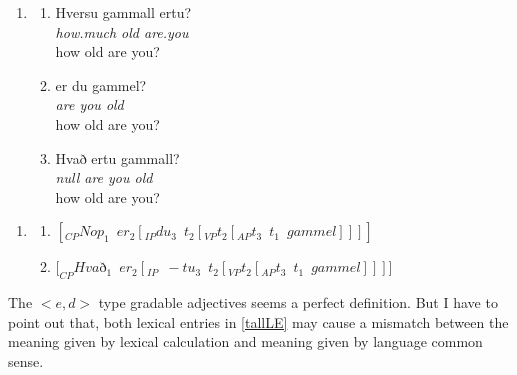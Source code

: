 \documentclass{ctexart}
\begin{document}
\begin{enumerate}
    \item \label{Icelandic_example}
    
    \begin{enumerate}
        \item \label{Icelandic_example_10}
        Hversu gammall ertu? \\
        \textit{how.much old are.you} \\
        how old are you?

        \item \label{Icelandic_example_a}
        er du gammel? \\
        \textit{are you old} \\
        how old are you?

        \item \label{Icelandic_example_b}
        Hvað ertu gammall? \\
        \textit{null are you old} \\
        how old are you?

    \end{enumerate}   
    
\end{enumerate}

\begin{enumerate}
    \item \label{Icelandic_example_LE}
    
    \begin{enumerate}
        \item $[_{CP}Nop_1 \enspace er_2[_{IP}du_3 \enspace t_2[_{VP} t_2[_{AP} t_3 \enspace t_1 \enspace gammel]]]]$
        
        \item $[_{CP}Hva$ð$_1 \enspace er_2[_{IP} \enspace -tu_3 \enspace t_2 [_{VP}t_2[_{AP}t_3 \enspace t_1 \enspace gammel]]]]$
        
    \end{enumerate}   
    
\end{enumerate}

\noindent
The $<e,d>$ type gradable adjectives seems a perfect definition. But I have to point out that, both lexical entries in \ref{tallLE} may cause a mismatch between the meaning given by lexical calculation and meaning given by language common sense. 
\end{document}
